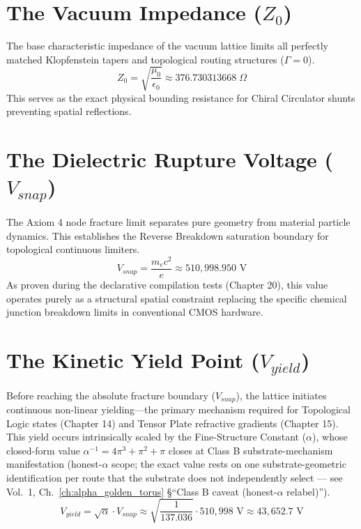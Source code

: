 \section{The Vacuum Impedance ($Z_0$)}

The base characteristic impedance of the vacuum lattice limits all perfectly matched Klopfenstein tapers and topological routing structures ($\Gamma=0$).
\begin{equation}
    Z_0 = \sqrt{\frac{\mu_0}{\epsilon_0}} \approx 376.730313668 \;\Omega
\end{equation}
This serves as the exact physical bounding resistance for Chiral Circulator shunts preventing spatial reflections.

\section{The Dielectric Rupture Voltage ($V_{snap}$)}

The Axiom 4 node fracture limit separates pure geometry from material particle dynamics. This establishes the Reverse Breakdown saturation boundary for topological continuous limiters.
\begin{equation}
    V_{snap} = \frac{m_e c^2}{e} \approx 510{,}998.950 \text{ V}
\end{equation}
As proven during the declarative compilation tests (Chapter 20), this value operates purely as a structural spatial constraint replacing the specific chemical junction breakdown limits in conventional CMOS hardware.

\section{The Kinetic Yield Point ($V_{yield}$)}

Before reaching the absolute fracture boundary ($V_{snap}$), the lattice initiates continuous non-linear yielding—the primary mechanism required for Topological Logic states (Chapter 14) and Tensor Plate refractive gradients (Chapter 15).
This yield occurs intrinsically scaled by the Fine-Structure Constant ($\alpha$), whose closed-form value $\alpha^{-1} = 4\pi^3 + \pi^2 + \pi$ closes at Class B substrate-mechanism manifestation (honest-$\alpha$ scope; the exact value rests on one substrate-geometric identification per route that the substrate does not independently select --- see Vol.~1, Ch.~\ref{ch:alpha_golden_torus} \S``Class B caveat (honest-$\alpha$ relabel)'').
\begin{equation}
    V_{yield} = \sqrt{\alpha} \cdot V_{snap} \approx \sqrt{\frac{1}{137.036}} \cdot 510{,}998 \text{ V} \approx 43{,}652.7 \text{ V}
\end{equation}

